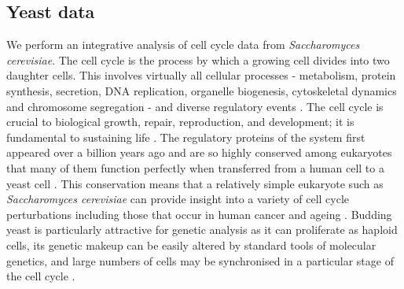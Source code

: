\documentclass{bioinfo}
\begin{document}
\subsection{Yeast data}
We perform an integrative analysis of cell cycle data from \emph{Saccharomyces cerevisiae}. The cell cycle is the process by which a growing cell divides into two daughter cells. This involves virtually all cellular processes - metabolism, protein synthesis, secretion, DNA replication, organelle biogenesis, cytoskeletal dynamics and chromosome segregation - and diverse regulatory events \citep{granovskaia2010high}. The cell cycle is crucial to biological growth, repair, reproduction, and development; it is fundamental to sustaining life \citep{tyson2013cell, chen2004integrative, alberts2018molecular}. The regulatory proteins of the system first appeared over a billion years ago and are so highly conserved among eukaryotes that many of them function perfectly when transferred from a human cell to a yeast cell \citep{alberts2018molecular}. This conservation means that a relatively simple eukaryote such as \emph{Saccharomyces cerevisiae} can provide insight into a variety of cell cycle perturbations including those that occur in human cancer \citep{ingalls2007systems, chen2004integrative} and ageing \citep{jimenez2015live}. Budding yeast is particularly attractive for genetic analysis as it can proliferate as haploid cells, its genetic makeup can be easily altered by standard tools of molecular genetics, and large numbers of cells may be synchronised in a particular stage of the cell cycle  \citep{tyson2013cell, juanes2017methods}.
\end{document}
